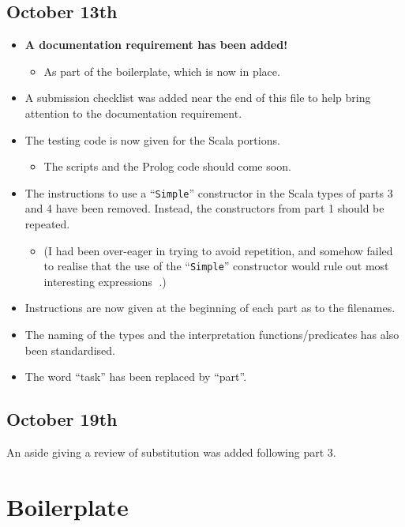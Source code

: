 \documentclass[11pt]{article}
\begin{document}
\subsection*{October 13th}
\label{sec:org28b196c}
\begin{itemize}
\item \textbf{A documentation requirement has been added!}
\begin{itemize}
\item As part of the boilerplate, which is now in place.
\end{itemize}
\item A submission checklist was added near the end of this file
to help bring attention to the documentation requirement.
\item The testing code is now given for the Scala portions.
\begin{itemize}
\item The scripts and the Prolog code should come soon.
\end{itemize}
\item The instructions to use a “\texttt{Simple}” constructor in
the Scala types of parts 3 and 4 have been removed.
Instead, the constructors from part 1 should be repeated.
\begin{itemize}
\item (I had been over-eager in trying to avoid repetition,
and somehow failed to realise that the use of the “\texttt{Simple}”
constructor would rule out most interesting expressions 🙁.)
\end{itemize}
\item Instructions are now given at the beginning of each part
as to the filenames.
\item The naming of the types and the interpretation functions/predicates
has also been standardised.
\item The word “task” has been replaced by “part”.
\end{itemize}

\subsection*{October 19th}
\label{sec:org9d88a74}
An aside giving a review of substitution was added following part 3.

\section*{Boilerplate}
\label{sec:org01fd887}
\end{document}
